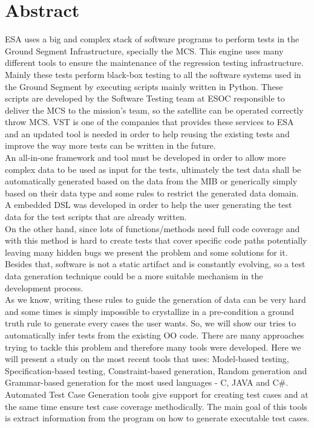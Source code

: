 \chapter*{Abstract}
\ac{ESA} uses a big and complex stack of software programs to perform tests in the
Ground Segment Infrastructure, specially the \ac{MCS}.
This engine uses many different tools to ensure the maintenance of the
regression testing infrastructure. Mainly these tests perform black-box
testing to all the software systems used in the Ground Segment by executing scripts mainly written in Python.
These scripts are developed by the Software Testing team at \ac{ESOC} responsible to deliver the \ac{MCS} to the mission's team, so the
satellite can be operated correctly throw \ac{MCS}.
\ac{VST} is one of the companies that provides
these services to \ac{ESA} and an updated tool is needed in order to help reusing the existing tests
and improve the way more tests can be written in the future.\\

An all-in-one framework and tool must be developed in order to allow more complex data to be used as input for the
tests, ultimately the test data shall be automatically generated based on the data from
the \ac{MIB} or generically simply based on their data type
and some rules to restrict the generated data domain.\\
A embedded \ac{DSL} was developed in order to help the user generating the test data for the test scripts that are already written.\\

On the other hand, since lots of functions/methods need full code coverage and with this method is hard to create tests that
cover specific code paths potentially leaving many hidden bugs we present the problem and some solutions for it.
Besides that, software is not a static artifact and is constantly
evolving, so a test data generation technique could be a more suitable mechanism in the development process.\\

As we know, writing these rules to guide the generation of data can be very hard and some times is simply impossible to
crystallize in a pre-condition a ground truth rule to generate every cases the user wants.
So, we will show our tries to automatically infer tests from the existing \ac{OO} code.
There are many approaches trying to tackle this problem and therefore
many tools were developed. Here we will present a study on the most
recent tools that uses: Model-based testing, Specification-based
testing, Constraint-based generation, Random generation and
Grammar-based generation for the most used languages - C, JAVA and C\#.\\
Automated Test Case Generation tools give support for creating test
cases and at the same time ensure test case coverage methodically. The
main goal of this tools is extract information from the program on how
to generate executable test cases.

